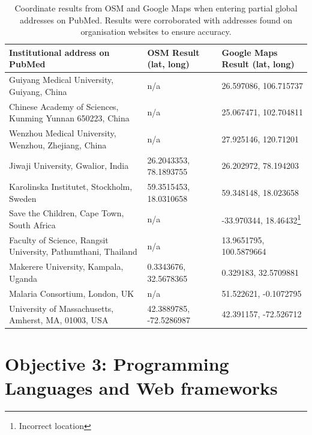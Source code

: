 \documentclass[PROP_AGutteridge_CS.tex]{subfiles}
\begin{document}
\begin{landscape}
\begin{savenotes}
\begin{table}[h]
\noindent
\begin{tabular}{ | l | p{6cm} | p{6cm} | }
    \hline
    \bf{Institutional address on PubMed} & \bf{      OSM   Result   (lat,   long)      } & \bf{Google Maps Result (lat, long)}\\ \hline
    Guiyang Medical University, Guiyang, China & n/a & 26.597086, 106.715737\\ 
    Chinese Academy of Sciences, Kunming Yunnan 650223, China & n/a & 25.067471, 102.704811\\ 
    Wenzhou Medical University, Wenzhou, Zhejiang, China & n/a & 27.925146, 120.71201\\ 
    Jiwaji University, Gwalior, India & 26.2043353, 78.1893755 & 26.202972, 78.194203\\ 
    Karolinska Institutet, Stockholm, Sweden & 59.3515453, 18.0310658 & 59.348148, 18.023658\\ 
    Save the Children, Cape Town, South Africa & n/a & -33.970344, 18.46432\footnote{Incorrect location}\\ 
    Faculty of Science, Rangsit University, Pathumthani, Thailand & n/a & 13.9651795, 100.5879664\\ 
    Makerere University, Kampala, Uganda & 0.3343676, 32.5678365 & 0.329183, 32.5709881\\ 
    Malaria Consortium, London, UK & n/a & 51.522621, -0.1072795\\ 
    University of Massachusetts, Amherst, MA, 01003, USA & 42.3889785, -72.5286987 & 42.391157, -72.526712\\ \hline
\end{tabular}
\noindent\caption{Coordinate results from OSM and Google Maps when entering partial global addresses on PubMed. Results were corroborated with addresses found on organisation websites to ensure accuracy.}
\end{table}%
\end{savenotes}
\end{landscape}

\section{Objective 3: Programming Languages and Web frameworks}
\end{document}
